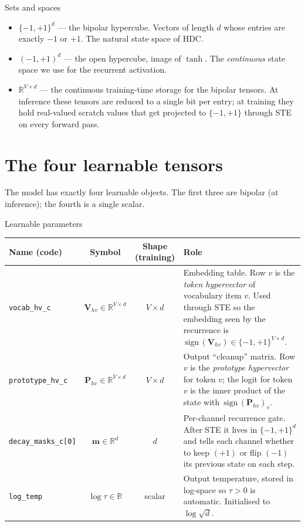 \documentclass[11pt,a4paper]{article}
\newcommand{\bVhv}{\mathbf{V}_{\!hv}}
\newcommand{\bPhv}{\mathbf{P}_{\!hv}}
\newcommand{\bm}{\mathbf{m}}
\newcommand{\bipset}{\{-1,+1\}}
\newcommand{\sg}{\,\text{sign}\,}
\begin{document}
\begin{notation}{Sets and spaces}
\begin{itemize}[leftmargin=18pt,itemsep=2pt]
  \item $\bipset^{d}$ --- the bipolar hypercube. Vectors of length $d$ whose
        entries are exactly $-1$ or $+1$. The natural state space of HDC.
  \item $(-1,+1)^{d}$ --- the open hypercube, image of $\tanh$. The
        \emph{continuous} state space we use for the recurrent activation.
  \item $\mathbb{R}^{V\times d}$ --- the continuous training-time storage for
        the bipolar tensors. At inference these tensors are reduced to a
        single bit per entry; at training they hold real-valued scratch values
        that get projected to $\bipset$ through STE on every forward pass.
\end{itemize}
\end{notation}

\section{The four learnable tensors}

The model has exactly four learnable objects. The first three are bipolar
(at inference); the fourth is a single scalar.

\begin{notation}{Learnable parameters}
\begin{tabular}{@{}lccp{60mm}@{}}
\toprule
Name (code) & Symbol & Shape (training) & Role \\
\midrule
\verb|vocab_hv_c|       & $\bVhv \in \mathbb{R}^{V\times d}$
   & $V \times d$ & Embedding table. Row $v$ is the \emph{token hypervector}
                    of vocabulary item $v$. Used through STE so the embedding
                    seen by the recurrence is $\sg(\bVhv) \in \bipset^{V\times d}$. \\
\verb|prototype_hv_c|   & $\bPhv \in \mathbb{R}^{V\times d}$
   & $V \times d$ & Output ``cleanup'' matrix. Row $v$ is the
                    \emph{prototype hypervector} for token $v$; the logit for
                    token $v$ is the inner product of the state with $\sg(\bPhv)_v$. \\
\verb|decay_masks_c[0]| & $\bm \in \mathbb{R}^{d}$
   & $d$ & Per-channel recurrence gate. After STE it lives in $\bipset^{d}$
          and tells each channel whether to keep $(+1)$ or flip $(-1)$ its
          previous state on each step. \\
\verb|log_temp|         & $\log\tau \in \mathbb{R}$
   & scalar & Output temperature, stored in log-space so $\tau > 0$ is
              automatic. Initialised to $\log\sqrt{d}$. \\
\bottomrule
\end{tabular}
\end{notation}
\end{document}
